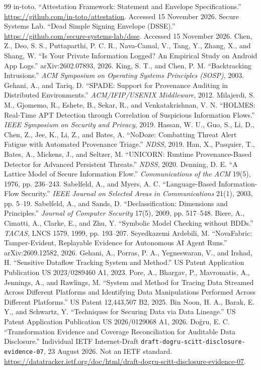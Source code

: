\documentclass[11pt,letterpaper]{article}
\newcommand{\code}[1]{\texttt{#1}}
\begin{document}
\begin{thebibliography}{99}
 in-toto. ``Attestation Framework: Statement and Envelope Specifications.'' \url{https://github.com/in-toto/attestation}. Accessed 15 November 2026.
 Secure Systems Lab. ``Dead Simple Signing Envelope (DSSE).'' \url{https://github.com/secure-systems-lab/dsse}. Accessed 15 November 2026.
 Chen, Z., Deo, S. S., Puttaparthi, P. C. R., Nava-Camal, V., Tang, Y., Zhang, X., and Shang, W. ``Is Your Private Information Logged? An Empirical Study on Android App Logs.'' arXiv:2602.07893, 2026.
 King, S. T., and Chen, P. M. ``Backtracking Intrusions.'' \emph{ACM Symposium on Operating Systems Principles (SOSP)}, 2003.
 Gehani, A., and Tariq, D. ``SPADE: Support for Provenance Auditing in Distributed Environments.'' \emph{ACM/IFIP/USENIX Middleware}, 2012.
 Milajerdi, S. M., Gjomemo, R., Eshete, B., Sekar, R., and Venkatakrishnan, V. N. ``HOLMES: Real-Time APT Detection through Correlation of Suspicious Information Flows.'' \emph{IEEE Symposium on Security and Privacy}, 2019.
 Hassan, W. U., Guo, S., Li, D., Chen, Z., Jee, K., Li, Z., and Bates, A. ``NoDoze: Combatting Threat Alert Fatigue with Automated Provenance Triage.'' \emph{NDSS}, 2019.
 Han, X., Pasquier, T., Bates, A., Mickens, J., and Seltzer, M. ``UNICORN: Runtime Provenance-Based Detector for Advanced Persistent Threats.'' \emph{NDSS}, 2020.
 Denning, D. E. ``A Lattice Model of Secure Information Flow.'' \emph{Communications of the ACM} 19(5), 1976, pp. 236--243.
 Sabelfeld, A., and Myers, A. C. ``Language-Based Information-Flow Security.'' \emph{IEEE Journal on Selected Areas in Communications} 21(1), 2003, pp. 5--19.
 Sabelfeld, A., and Sands, D. ``Declassification: Dimensions and Principles.'' \emph{Journal of Computer Security} 17(5), 2009, pp. 517--548.
 Biere, A., Cimatti, A., Clarke, E., and Zhu, Y. ``Symbolic Model Checking without BDDs.'' \emph{TACAS}, LNCS 1579, 1999, pp. 193--207.
 Seyedkazemi Ardebili, M. ``NovaFabric: Tamper-Evident, Replayable Evidence for Autonomous AI Agent Runs.'' arXiv:2609.12582, 2026.
 Gehani, A., Porras, P. A., Yegneswaran, V., and Irshad, H. ``Sensitive Dataflow Tracking System and Method.'' US Patent Application Publication US 2023/0289460 A1, 2023.
 Pore, A., Bhargav, P., Mavromatis, A., Jennings, A., and Rawlings, M. ``System and Method for Tracing Data Streamed Across Different Platforms and Identifying Data Manipulations Performed Across Different Platforms.'' US Patent 12,443,507 B2, 2025.
 Bin Noon, H. A., Barak, E. Y., and Schwartz, Y. ``Techniques for Securing Data via Data Lineage.'' US Patent Application Publication US 2026/0129068 A1, 2026.
 Do\u{g}ru, E. C. ``Transformation Evidence and Coverage Reconciliation for Auditable Data Disclosure.'' Individual IETF Internet-Draft \code{draft-dogru-scitt-disclosure-evidence-07}, 23 August 2026. Not an IETF standard. \url{https://datatracker.ietf.org/doc/html/draft-dogru-scitt-disclosure-evidence-07}.
\end{thebibliography}
\end{document}
